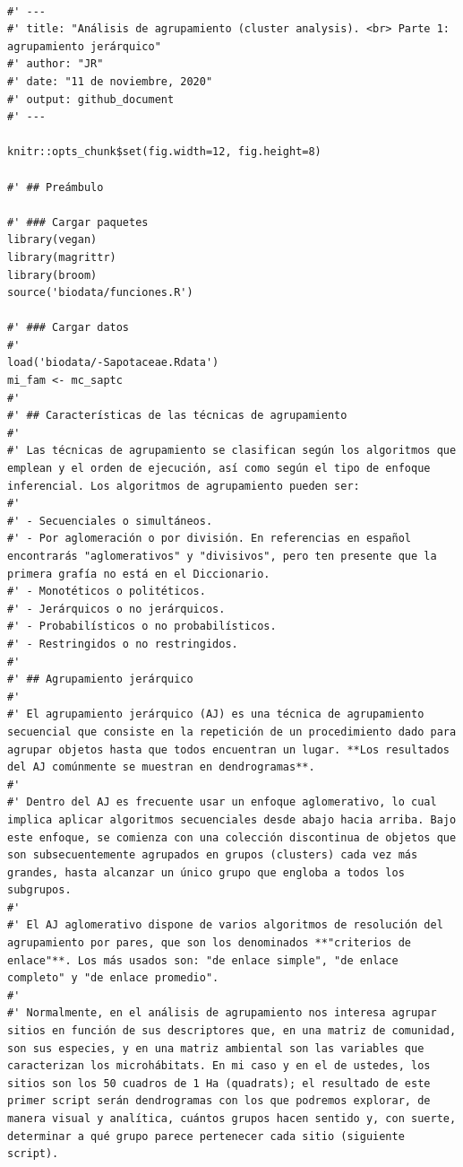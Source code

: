 \documentclass[11pt,]{article}
\begin{document}
\begin{verbatim}

#' ---
#' title: "Análisis de agrupamiento (cluster analysis). <br> Parte 1: agrupamiento jerárquico"
#' author: "JR"
#' date: "11 de noviembre, 2020"
#' output: github_document
#' ---

knitr::opts_chunk$set(fig.width=12, fig.height=8)

#' ## Preámbulo

#' ### Cargar paquetes
library(vegan)
library(magrittr)
library(broom)
source('biodata/funciones.R')

#' ### Cargar datos
#' 
load('biodata/-Sapotaceae.Rdata')
mi_fam <- mc_saptc
#'
#' ## Características de las técnicas de agrupamiento
#' 
#' Las técnicas de agrupamiento se clasifican según los algoritmos que emplean y el orden de ejecución, así como según el tipo de enfoque inferencial. Los algoritmos de agrupamiento pueden ser:
#' 
#' - Secuenciales o simultáneos.
#' - Por aglomeración o por división. En referencias en español encontrarás "aglomerativos" y "divisivos", pero ten presente que la primera grafía no está en el Diccionario.
#' - Monotéticos o politéticos.
#' - Jerárquicos o no jerárquicos.
#' - Probabilísticos o no probabilísticos.
#' - Restringidos o no restringidos.
#' 
#' ## Agrupamiento jerárquico
#' 
#' El agrupamiento jerárquico (AJ) es una técnica de agrupamiento secuencial que consiste en la repetición de un procedimiento dado para agrupar objetos hasta que todos encuentran un lugar. **Los resultados del AJ comúnmente se muestran en dendrogramas**.
#' 
#' Dentro del AJ es frecuente usar un enfoque aglomerativo, lo cual implica aplicar algoritmos secuenciales desde abajo hacia arriba. Bajo este enfoque, se comienza con una colección discontinua de objetos que son subsecuentemente agrupados en grupos (clusters) cada vez más grandes, hasta alcanzar un único grupo que engloba a todos los subgrupos.
#' 
#' El AJ aglomerativo dispone de varios algoritmos de resolución del agrupamiento por pares, que son los denominados **"criterios de enlace"**. Los más usados son: "de enlace simple", "de enlace completo" y "de enlace promedio".
#' 
#' Normalmente, en el análisis de agrupamiento nos interesa agrupar sitios en función de sus descriptores que, en una matriz de comunidad, son sus especies, y en una matriz ambiental son las variables que caracterizan los microhábitats. En mi caso y en el de ustedes, los sitios son los 50 cuadros de 1 Ha (quadrats); el resultado de este primer script serán dendrogramas con los que podremos explorar, de manera visual y analítica, cuántos grupos hacen sentido y, con suerte, determinar a qué grupo parece pertenecer cada sitio (siguiente script).

\end{verbatim}
\end{document}
